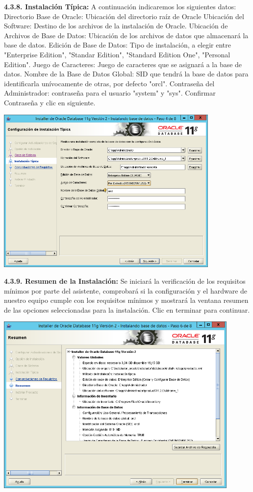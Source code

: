 \textbf {4.3.8. Instalación Típica:} A continuación indicaremos los siguientes datos:
Directorio Base de Oracle: Ubicación del directorio raíz de Oracle
Ubicación del Software: Destino de los archivos de la instalación de Oracle.
Ubicación de Archivos de Base de Datos: Ubicación de los archivos de datos que almacenará la base de datos.
Edición de Base de Datos: Tipo de instalación, a elegir entre "Enterprise Edition", "Standar Edition", "Standard Edition One", "Personal Edition". 
Juego de Caracteres: Juego de caracteres que se asignará a la base de datos.
Nombre de la Base de Datos Global: SID que tendrá la base de datos para identificarla unívocamente de otras, por defecto "orcl".
Contraseña del Administrador: contraseña para el usuario "system" y "sys".
Confirmar Contraseña y clic en siguiente.
\begin{center}
  \includegraphics[width=11cm]{Imagenes/Instalacion_Tipica.png}
\end{center}
\break

\textbf {4.3.9. Resumen de la Instalación:} Se iniciará la verificación de los requisitos mínimos por parte del asistente, comprobará si la configuración y el hardware de nuestro equipo cumple con los requisitos mínimos y mostrará la ventana resumen de las opciones seleccionadas para la instalación. Clic en terminar para continuar.
\begin{center}
  \includegraphics[width=12cm]{Imagenes/Resumen_Instalacion.png}
\end{center}

